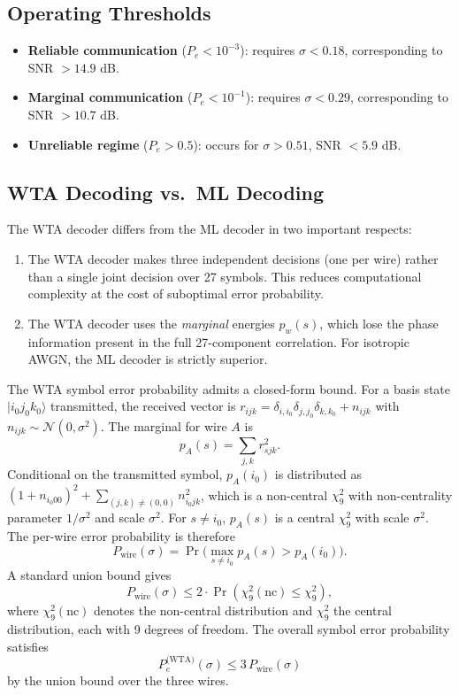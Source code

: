 \documentclass[12pt,a4paper]{article}
\begin{document}
\subsection{Operating Thresholds}

\begin{itemize}
\item \textbf{Reliable communication} ($P_e < 10^{-3}$): requires
$\sigma < 0.18$, corresponding to SNR $> 14.9$ dB.
\item \textbf{Marginal communication} ($P_e < 10^{-1}$): requires
$\sigma < 0.29$, corresponding to SNR $> 10.7$ dB.
\item \textbf{Unreliable regime} ($P_e > 0.5$): occurs for $\sigma > 0.51$,
SNR $< 5.9$ dB.
\end{itemize}

\subsection{WTA Decoding vs.\ ML Decoding}

The WTA decoder differs from the ML decoder in two important respects:
\begin{enumerate}
\item The WTA decoder makes three independent decisions (one per wire)
rather than a single joint decision over 27 symbols. This reduces
computational complexity at the cost of suboptimal error probability.
\item The WTA decoder uses the \emph{marginal} energies $p_w(s)$,
which lose the phase information present in the full 27-component
correlation. For isotropic AWGN, the ML decoder is strictly superior.
\end{enumerate}

The WTA symbol error probability admits a closed-form bound. For a
basis state $|i_0j_0k_0\rangle$ transmitted, the received vector is
$r_{ijk} = \delta_{i,i_0}\delta_{j,j_0}\delta_{k,k_0} + n_{ijk}$
with $n_{ijk} \sim \mathcal{N}(0,\sigma^2)$. The marginal for wire $A$ is
\[
p_A(s) = \sum_{j,k} r_{sjk}^2.
\]
Conditional on the transmitted symbol, $p_A(i_0)$ is distributed as
$(1 + n_{i_0 0 0})^2 + \sum_{(j,k) \neq (0,0)} n_{i_0 j k}^2$, which is
a non-central $\chi^2_9$ with non-centrality parameter $1/\sigma^2$ and
scale $\sigma^2$. For $s \neq i_0$, $p_A(s)$ is a central $\chi^2_9$
with scale $\sigma^2$. The per-wire error probability is therefore
\[
P_{\text{wire}}(\sigma) = \Pr\bigl(\max_{s \neq i_0} p_A(s) > p_A(i_0)\bigr).
\]
A standard union bound gives
\[
P_{\text{wire}}(\sigma) \le 2 \cdot \Pr(\chi^2_9(\text{nc}) \le \chi^2_9),
\]
where $\chi^2_9(\text{nc})$ denotes the non-central distribution and
$\chi^2_9$ the central distribution, each with 9 degrees of freedom.
The overall symbol error probability satisfies
\[
P_e^{\text{(WTA)}}(\sigma) \le 3\,P_{\text{wire}}(\sigma)
\]
by the union bound over the three wires.
\end{document}
